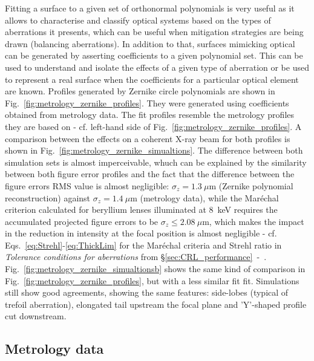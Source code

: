\begin{refsection}
Fitting a surface to a given set of orthonormal polynomials is very useful as it allows to characterise and classify optical systems based on the types of aberrations it presents, which can be useful when mitigation strategies are being drawn (balancing aberrations). In addition to that, surfaces mimicking optical can be generated by asserting coefficients to a given polynomial set. This can be used to understand and isolate the effects of a given type of aberration or be used to represent a real surface when the coefficients for a particular optical element are known. Profiles generated by Zernike circle polynomials are shown in Fig.~\ref{fig:metrology_zernike_profiles}. They were generated using coefficients obtained from metrology data. The fit profiles resemble the metrology profiles they are based on - cf. left-hand side of Fig.~\ref{fig:metrology_zernike_profiles}. A comparison between the effects on a coherent X-ray beam for both profiles is shown in Fig.~\ref{fig:metrology_zernike_simualtions}. The difference between both simulation sets is almost imperceivable, whuch can be explained by the similarity between both figure error profiles and the fact that the difference between the figure errors RMS value is almost negligible: $\sigma_z=1.3~\mu$m (Zernike polynomial reconstruction) against $\sigma_z=1.4~\mu$m (metrology data), while the Mar\'echal criterion calculated for beryllium lenses illuminated at $8$~keV requires the accumulated projected figure errors to be $\sigma_z\leq2.08~\mu$m, which makes the impact in the reduction in intensity at the focal position is almost negligible - cf. Eqs.~\ref{eq:Strehl}-\ref{eq:ThickLim} for the Mar\'echal criteria and Strehl ratio in \textit{Tolerance conditions for aberrations} from \S\ref{sec:CRL_performance}~-~\textit{}. Fig.~\ref{fig:metrology_zernike_simualtionsb} shows the same kind of comparison in Fig.~\ref{fig:metrology_zernike_profiles}, but with a less similar fit fit. Simulations still show good agreements, showing the same features: side-lobes (typical of trefoil aberration), elongated tail upstream the focal plane and 'Y'-shaped profile cut downstream.

\subsection{Metrology data}\label{sec:metrology_data}


\end{refsection}
